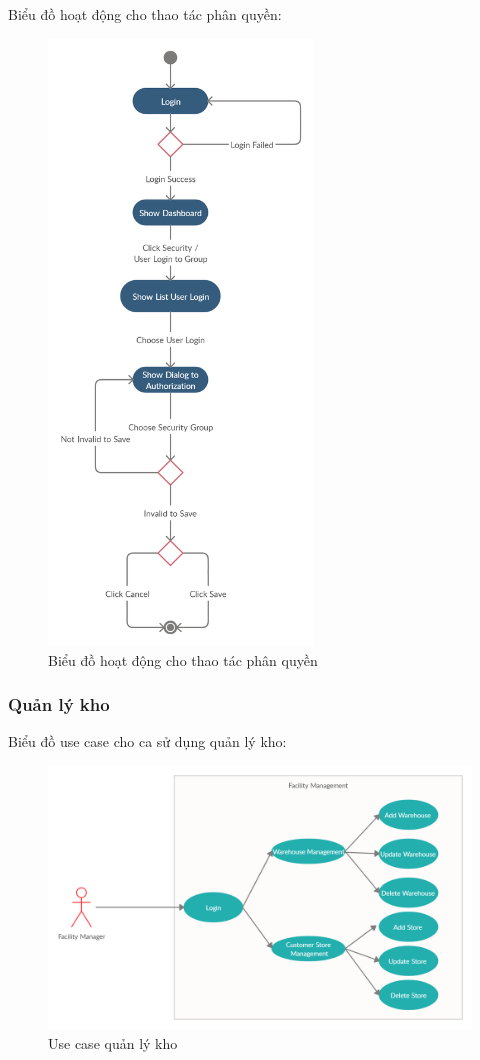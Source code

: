 Biểu đồ hoạt động cho thao tác phân quyền:
\begin{figure}[H]
\centering
\includegraphics[width=7cm]
{images/activity-diagram/assign-permissions.png}
\caption{Biểu đồ hoạt động cho thao tác phân quyền}
\end{figure}

\subsubsection{Quản lý kho}
Biểu đồ use case cho ca sử dụng quản lý kho:
\begin{figure}[H]
\centering
\includegraphics[width=14cm]{images/use-case/facility-management.jpg}
\caption{Use case quản lý kho}
\end{figure}

